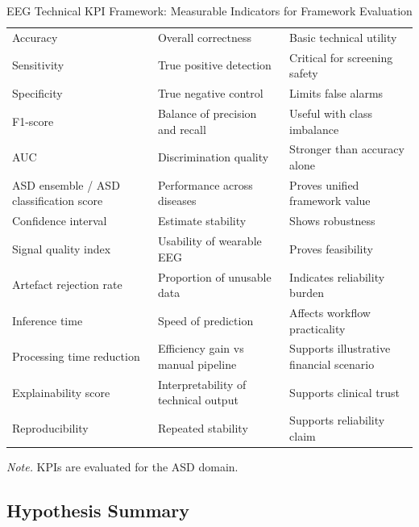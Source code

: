 {\tablestripes\tablefontsize
{}
\begin{xltabular}{\textwidth}{@{} l L L @{}}
\caption[EEG Technical KPI Framework: Measurable Indicators for]{EEG Technical KPI Framework: Measurable Indicators for Framework Evaluation}\label{tab:eeg_kpi} \\
\toprule
{} &  &  \\
\midrule
\endfirsthead
\endhead
\bottomrule
\endlastfoot
Accuracy & Overall correctness & Basic technical utility \\
Sensitivity & True positive detection & Critical for screening safety \\
Specificity & True negative control & Limits false alarms \\
F1-score & Balance of precision and recall & Useful with class imbalance \\
AUC & Discrimination quality & Stronger than accuracy alone \\
ASD ensemble / ASD classification score & Performance across diseases & Proves unified framework value \\
Confidence interval & Estimate stability & Shows robustness \\
Signal quality index & Usability of wearable EEG & Proves feasibility \\
Artefact rejection rate & Proportion of unusable data & Indicates reliability burden \\
Inference time & Speed of prediction & Affects workflow practicality \\
Processing time reduction & Efficiency gain vs manual pipeline & Supports illustrative financial scenario \\
Explainability score & Interpretability of technical output & Supports clinical trust \\
Reproducibility & Repeated stability & Supports reliability claim \\
\end{xltabular}}
\vspace{2pt}
\noindent\textit{Note.} KPIs are evaluated for the ASD domain.
\fi %


\subsection{Hypothesis Summary}

